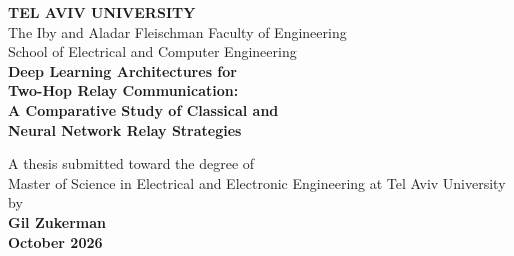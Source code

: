\documentclass[12pt,a4paper,oneside]{book}
\theoremstyle{definition}
\begin{document}
\hypersetup{pageanchor=false}
\begin{titlepage}
\begin{center}
\vspace*{0.5cm}
{\LARGE\textbf{TEL AVIV UNIVERSITY}}\\[6pt]
{\large The Iby and Aladar Fleischman Faculty of Engineering}\\[4pt]
{\large School of Electrical and Computer Engineering}\\[2cm]

{\LARGE\bfseries
Deep Learning Architectures for\\
Two-Hop Relay Communication:\\
A Comparative Study of Classical and\\
Neural Network Relay Strategies\\[2cm]
}

{\large A thesis submitted toward the degree of}\\
{\large Master of Science in Electrical and Electronic Engineering \newline at Tel Aviv University}\\[1.5cm]

{\large by}\\[6pt]
{\Large\bfseries Gil Zukerman}\\[1.5cm]
\vfill
{\large\textbf{October 2026}}\\[1.5cm]

\end{center}
\end{titlepage}
\end{document}
